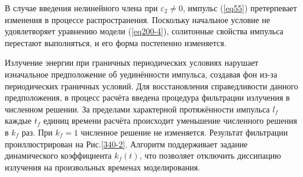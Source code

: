 \documentclass[14pt,a4paper]{extreport}
\begin{document}
			В случае введения нелинейного члена при \(\varepsilon_{2}\ne 0\), импульс (\ref{eq55}) претерпевает изменения в процессе распространения. Поскольку начальное условие не удовлетворяет уравнению модели (\ref{eq200-4}), солитонные свойства импульса перестают выполняться, и его форма постепенно изменяется. 
			
			Излучение энергии при граничных периодических условиях нарушает изначальное предположение об уединённости импульса, создавая фон из-за периодических граничных условий. Для восстановления справедливости данного предположения, в процесс расчёта введена процедура фильтрации излучения в численном решении. За пределами характерной протяжённости импульса \(l_{f}\) каждые \(t_{f}\) единиц времени расчёта происходит уменьшение численного решения в \(k_{f}\) раз. При \(k_{f}=1\) численное решение не изменяется. Результат фильтрации проиллюстрирован на Рис.\ref{340-2}. Алгоритм поддерживает задание динамического коэффициента \(k_{f}\left(t\right)\), что позволяет отключить диссипацию излучения на произвольных временах моделирования.
\end{document}
